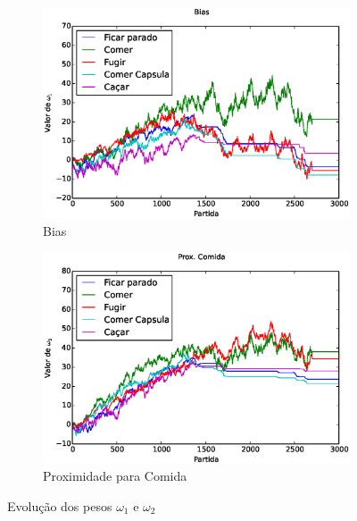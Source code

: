 \begin{figure}[h]
	\centering
	\begin{subfigure}[t]{.5\textwidth}
		\centering
		\includegraphics[width=\linewidth]{images/5_behaviors_small_map/weights____pol__Bias}
		\caption{Bias}
		\label{img:5ComportamentosMapaPequeno:PesoBias}
	\end{subfigure}%
	\begin{subfigure}[t]{.5\textwidth}
		\centering
		\includegraphics[width=\linewidth]{images/5_behaviors_small_map/weights____pol__DistComida}
		\caption{Proximidade para Comida}
		\label{img:5ComportamentosMapaPequeno:PesoDistComida}
	\end{subfigure}
	\caption{Evolução dos pesos $ \omega_1 $ e $ \omega_2 $}
	\label{img:5ComportamentosMapaPequeno:PesoBiasAndDistComida}
\end{figure}

